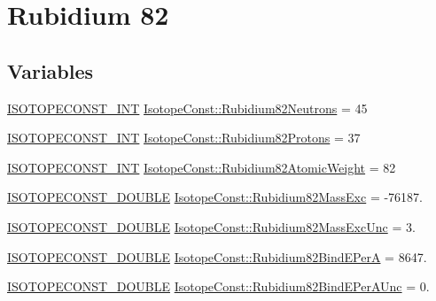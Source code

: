 \hypertarget{group___isotope_const-_rubidium-_rb82}{}\section{Rubidium 82}
\label{group___isotope_const-_rubidium-_rb82}
\subsection*{Variables}
\begin{DoxyCompactItemize}
\item 
\mbox{\hyperlink{group___isotope_const-_macros_ga5f18360b3e99483a35c32d789e62621c}{I\+S\+O\+T\+O\+P\+E\+C\+O\+N\+S\+T\+\_\+\+I\+NT}} \mbox{\hyperlink{group___isotope_const-_rubidium-_rb82_ga1e4acf4877cdd658cad1b7e139d43b57}{Isotope\+Const\+::\+Rubidium82\+Neutrons}} = 45
\item 
\mbox{\hyperlink{group___isotope_const-_macros_ga5f18360b3e99483a35c32d789e62621c}{I\+S\+O\+T\+O\+P\+E\+C\+O\+N\+S\+T\+\_\+\+I\+NT}} \mbox{\hyperlink{group___isotope_const-_rubidium-_rb82_ga77658f665ecca9ffcc203c5df5153115}{Isotope\+Const\+::\+Rubidium82\+Protons}} = 37
\item 
\mbox{\hyperlink{group___isotope_const-_macros_ga5f18360b3e99483a35c32d789e62621c}{I\+S\+O\+T\+O\+P\+E\+C\+O\+N\+S\+T\+\_\+\+I\+NT}} \mbox{\hyperlink{group___isotope_const-_rubidium-_rb82_ga591128ed4a8d7ebb3c60e29c473054dd}{Isotope\+Const\+::\+Rubidium82\+Atomic\+Weight}} = 82
\item 
\mbox{\hyperlink{group___isotope_const-_macros_ga8f45a7272ce02c0b4c65c44636ed719a}{I\+S\+O\+T\+O\+P\+E\+C\+O\+N\+S\+T\+\_\+\+D\+O\+U\+B\+LE}} \mbox{\hyperlink{group___isotope_const-_rubidium-_rb82_gaa96c9d52d10b8fff81966efb7a059a84}{Isotope\+Const\+::\+Rubidium82\+Mass\+Exc}} = -\/76187.
\item 
\mbox{\hyperlink{group___isotope_const-_macros_ga8f45a7272ce02c0b4c65c44636ed719a}{I\+S\+O\+T\+O\+P\+E\+C\+O\+N\+S\+T\+\_\+\+D\+O\+U\+B\+LE}} \mbox{\hyperlink{group___isotope_const-_rubidium-_rb82_ga4ebb19a0f17305564aefd592a3076f50}{Isotope\+Const\+::\+Rubidium82\+Mass\+Exc\+Unc}} = 3.
\item 
\mbox{\hyperlink{group___isotope_const-_macros_ga8f45a7272ce02c0b4c65c44636ed719a}{I\+S\+O\+T\+O\+P\+E\+C\+O\+N\+S\+T\+\_\+\+D\+O\+U\+B\+LE}} \mbox{\hyperlink{group___isotope_const-_rubidium-_rb82_gabebce11cacd0ee47b38494cdf3fece96}{Isotope\+Const\+::\+Rubidium82\+Bind\+E\+PerA}} = 8647.
\item 
\mbox{\hyperlink{group___isotope_const-_macros_ga8f45a7272ce02c0b4c65c44636ed719a}{I\+S\+O\+T\+O\+P\+E\+C\+O\+N\+S\+T\+\_\+\+D\+O\+U\+B\+LE}} \mbox{\hyperlink{group___isotope_const-_rubidium-_rb82_ga780e0e7fdf9253ece51e6f83e6a28d09}{Isotope\+Const\+::\+Rubidium82\+Bind\+E\+Per\+A\+Unc}} = 0.

\end{DoxyCompactItemize}
